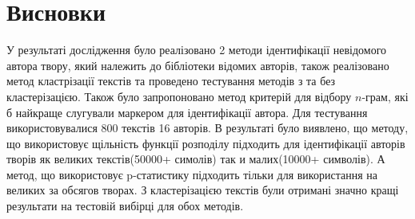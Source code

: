 \documentclass[12pt, a4paper]{extarticle}
\begin{document}
\section{Висновки}
У результаті дослідження було реалізовано 2 методи ідентифікації невідомого автора твору, який належить до бібліотеки відомих авторів, також реалізовано метод кластрізації текстів та проведено тестування методів з та без кластерізацією. Також було запропоновано метод критерій для відбору $n$-грам, які б найкраще слугували маркером для ідентифікації автора. Для тестування використовувалися 800 текстів 16 авторів. В результаті було виявлено, що методу, що використовує щільність функції розподілу підходить для ідентифікації авторів творів як великих текстів(50000+ симолів) так и малих(10000+ символів). А метод, що використовує p-статистику підходить тільки для використання на великих за обсягов творах. З кластерізацією текстів були отримані значно кращі результати на тестовій вибірці для обох методів.


 
\end{document}
